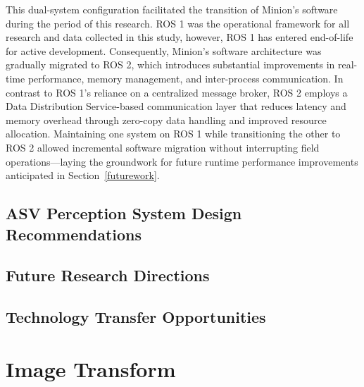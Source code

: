 \documentclass{erauthesis}
\begin{document}
This dual-system configuration facilitated the transition of Minion's software during the period of this research.
\ac{ROS} 1 was the operational framework for all research and data collected in this study, however, \ac{ROS} 1 has entered end-of-life for active development.
Consequently, Minion’s software architecture was gradually migrated to \ac{ROS} 2, which introduces substantial improvements in real-time performance, memory management, and inter-process communication.
In contrast to ROS 1’s reliance on a centralized message broker, ROS 2 employs a Data Distribution Service-based communication layer that reduces latency and memory overhead through zero-copy data handling and improved resource allocation.
Maintaining one system on ROS 1 while transitioning the other to ROS 2 allowed incremental software migration without interrupting field operations—laying the groundwork for future runtime performance improvements anticipated in Section~\ref{futurework}.


\section{ASV Perception System Design Recommendations}

\section{Future Research Directions}

\section{Technology Transfer Opportunities}




% 


\backmatter


\chapter{Image Transform} \label{img_tform}
\end{document}
